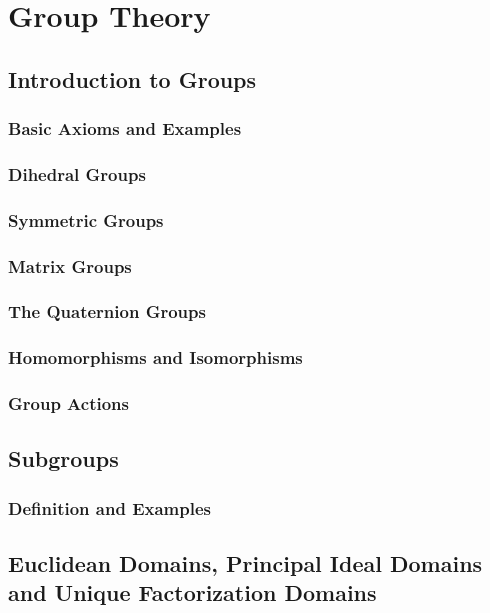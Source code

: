 \documentclass[cn,11pt,chinese]{elegantbook}
\numberwithin{equation}{section}
\begin{document}
\part{Group Theory}
\chapter{Introduction to Groups}\label{chapter001}
\section{Basic Axioms and Examples}\label{section00101}


\section{Dihedral Groups}\label{section00102}



\section{Symmetric Groups}\label{section00103}



\section{Matrix Groups}\label{section00104}



\section{The Quaternion Groups}\label{section00105}



\section{Homomorphisms and Isomorphisms}\label{section00106}



\section{Group Actions}\label{section00107}




\chapter{Subgroups}\label{chapter002}
\section{Definition and Examples}\label{section00201}


\chapter{Euclidean Domains, Principal Ideal Domains and Unique Factorization Domains}\label{chapter008}





% 

\appendix
\end{document}
